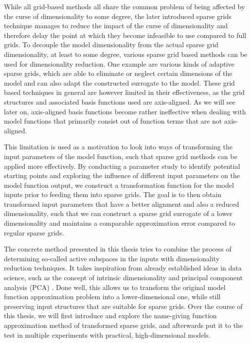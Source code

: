 \documentclass[
  a4paper,  %
  twoside,  %
  bibliography=totoc,
  headsepline,
  cleardoublepage=empty,
  parskip=half,
  draft=false
]{scrbook}
\begin{document}
While all grid-based methods all share the common problem of being affected by the curse of dimensionality to some degree, the later introduced sparse grids technique \cite{Zenger1991} manages to reduce the impact of the curse of dimensionality and therefore delay the point at which they become infeasible to use compared to full grids.
To decouple the model dimensionality from the actual sparse grid dimensionality, at least to some degree, various sparse grid based methods can be used for dimensionality reduction.
One example are various kinds of adaptive sparse grids, which are able to eliminate or neglect certain dimensions of the model and can also adapt the constructed surrogate to the model.
These grid based techniques in general are however limited in their effectiveness, as the grid structures and associated basis functions used are axis-aligned.
As we will see later on, axis-aligned basis functions become rather ineffective when dealing with model functions that primarily consist out of function terms that are not axis-aligned.

This limitation is used as a motivation to look into ways of transforming the input parameters of the model function, such that sparse grid methods can be applied more effectively.
By conducting a parameter study to identify potential starting points and exploring the influence of different input parameters on the model function output, we construct a transformation function for the model inputs prior to feeding them into sparse grids.
The goal is to then obtain transformed input parameters that have a better alignment and also a reduced dimensionality, such that we can construct a sparse grid surrogate of a lower dimensionality and maintains a comparable approximation error compared to regular sparse grids.

The concrete method presented in this thesis tries to combine the process of determining so-called active subspaces in the inputs \cite{Constantine2015} with dimensionality reduction techniques.
It takes inspiration from already established ideas in data science, such as the concept of intrinsic dimensionality \cite{Bennett1969} and principal component analysis (PCA) \cite{Abdi2010}.
Done well, this allows us to transform the original model function approximation problem into a lower-dimensional one, while still preserving input structures that are suitable for sparse grids.
Over the course of this thesis, we will first introduce and explore the name-giving function approximation method of transformed sparse grids, and afterwards put it to the test in multiple experiments with practical, high-dimensional models. 
\end{document}
